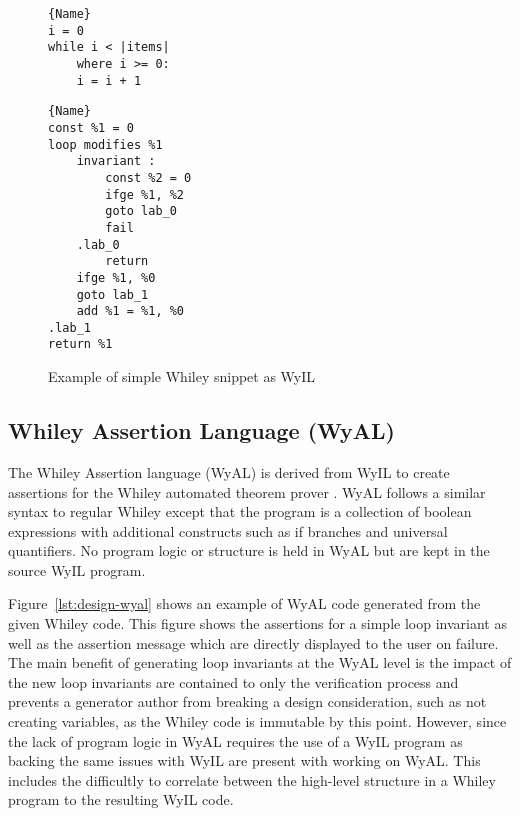 \begin{figure}
\noindent\begin{minipage}{.45\textwidth}
\begin{lstlisting}[caption={Whiley Code},frame=tlrb,numbers=none]{Name}
i = 0
while i < |items|
    where i >= 0:
    i = i + 1
\end{lstlisting}
\end{minipage}\hfill
\begin{minipage}{.45\textwidth}
\begin{lstlisting}[caption={WyIL Code},frame=tlrb,numbers=none]{Name}
const %1 = 0
loop modifies %1
    invariant :
        const %2 = 0
        ifge %1, %2
        goto lab_0
        fail
    .lab_0
        return
    ifge %1, %0
    goto lab_1
    add %1 = %1, %0
.lab_1
return %1
\end{lstlisting}
\end{minipage}
    \label{lst:design-wyil}
    \caption{Example of simple Whiley snippet as WyIL}
\end{figure}

\subsection{Whiley Assertion Language (WyAL)}

The Whiley Assertion language (WyAL) is derived from WyIL to create
assertions for the Whiley automated theorem prover \cite{wyal}.
WyAL follows a similar syntax to regular Whiley except that the program
is a collection of boolean expressions with additional constructs such as
if branches and universal quantifiers.
No program logic or structure is held in WyAL but are kept in the source
WyIL program.

Figure~\ref{lst:design-wyal} shows an example of WyAL code generated from
the given Whiley code.
This figure shows the assertions for a simple loop invariant as well as the
assertion message which are directly displayed to the user on failure.
The main benefit of generating loop invariants at the WyAL level is the
impact of the new loop invariants are contained to only the verification
process and prevents a generator author from breaking a design consideration,
such as not creating variables, as the Whiley code is immutable by this point.
However, since the lack of program logic in WyAL requires the use of a WyIL program
as backing the same issues with WyIL are present with working on WyAL.
This includes the difficultly to correlate between the high-level structure
in a Whiley program to the resulting WyIL code.

